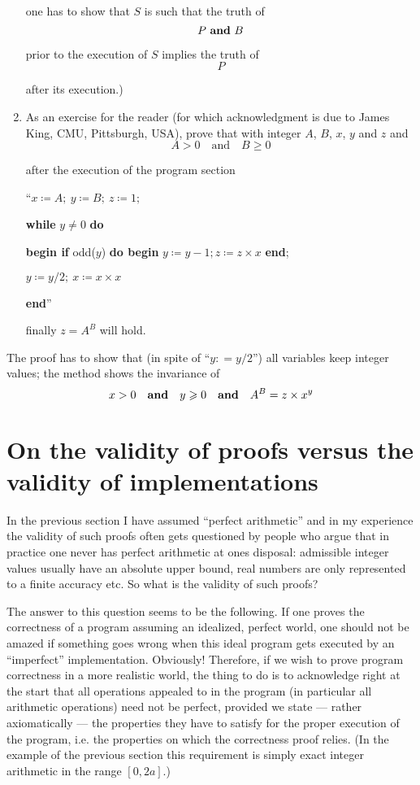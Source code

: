 \begin{enumerate}[leftmargin=*, itemindent=3\parindent, label=\textit{Remark }\arabic*.]
	one has to show that $S$ is such that the truth of
	$$
	P \text{ \textbf{and} } B
	$$
	
	prior to the execution of $S$ implies the truth of
	$$ P $$
	
	after its execution.)
	\item As an exercise for the reader (for which acknowledgment is due to James King, CMU, Pittsburgh, USA), prove that with integer $A$, $B$, $x$, $y$ and $z$ and
	$$
	A > 0\quad \text{and}\quad B\geqslant 0
	$$
	
	after the execution of the program section
	
	{
		\setlength{\parindent}{8em}
		\hspace{-.5em}``$x \coloneq A;\ y \coloneq B;\ z \coloneq 1;$
		
		\textbf{while} $y \neq 0$ \textbf{do}
		
		\quad\textbf{begin if} odd($y$) \textbf{do begin} $y \coloneq y - 1; z \coloneq z \times x$ \textbf{end};
		
		\quad\quad $y \coloneq y/2;\ x \coloneq x \times x$
		
		\quad\textbf{end}''
	}
	
	finally $z = A^B$ will hold.
\end{enumerate}


The proof has to show that (in spite of ``$y: = y/2$'') all variables keep integer values; the method shows the invariance of
$$
x > 0\quad \text{\textbf{and}}\quad y \geqslant 0\quad \text{\textbf{and}}\quad A^B = z \times x^y
$$

\section{On the validity of proofs versus the validity of implementations}

In the previous section I have assumed ``perfect arithmetic'' and in my experience the validity of such proofs often gets questioned by people who argue that in practice one never has perfect arithmetic at ones disposal: admissible integer values usually have an absolute upper bound, real numbers are only represented to a finite accuracy etc. So what is the validity of such proofs?

The answer to this question seems to be the following. If one proves the correctness of a program assuming an idealized, perfect world, one should not be amazed if something goes wrong when this ideal program gets executed by an ``imperfect'' implementation. Obviously! Therefore, if we wish to prove program correctness in a more realistic world, the thing to do is to acknowledge right at the start that all operations appealed to in the program (in particular all arithmetic operations) need not be perfect, provided we state --- rather axiomatically --- the properties they have to satisfy for the proper execution of the program, i.e. the properties on which the correctness proof relies. (In the example of the previous section this requirement is simply exact integer arithmetic in the range $[0, 2a]$.)


